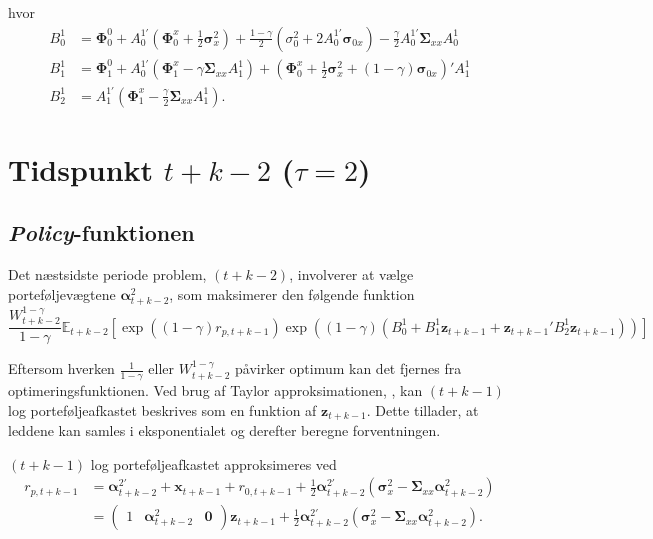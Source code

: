 \documentclass[
  a4paper,
  oneside]{memoir}
\begin{document}
hvor
\begin{align*}
B_0^1&=\bm{\Phi}_0^0 + A_0^{1\prime} \left(\bm{\Phi}_0^x + \frac{1}{2} \bm{\sigma}_x^2\right) + \frac{1-\gamma}{2}\left(\sigma_0^2 + 2 A_0^{1\prime} \bm{\sigma}_{0x}\right) - \frac{\gamma}{2} A_0^{1\prime} \bm{\Sigma}_{xx} A_0^1\\
B_1^1&=\bm{\Phi}_1^0 + A_0^{1\prime}\left(\bm{\Phi}_1^x - \gamma \bm{\Sigma}_{xx} A_1^1\right) + \left(\bm{\Phi}_{0}^x + \frac{1}{2} \bm{\sigma}_x^2 + \left(1-\gamma\right)\bm{\sigma}_{0x}\right)' A_1^1\\
B_2^1&=A_1^{1\prime} \left(\bm{\Phi}_1^x - \frac{\gamma}{2} \bm{\Sigma}_{xx} A_1^1\right).
\end{align*}

\hypertarget{tidspunkt-tk-2-tau2}{%
\section{\texorpdfstring{Tidspunkt \(t+k-2\) (\(\tau=2\))}{Tidspunkt t+k-2 (\textbackslash tau=2)}}\label{tidspunkt-tk-2-tau2}}

\hypertarget{policy-funktionen-1}{%
\subsection{\texorpdfstring{\emph{Policy}-funktionen}{Policy-funktionen}}\label{policy-funktionen-1}}

Det næstsidste periode problem, \((t+k-2)\), involverer at vælge porteføljevægtene \(\bm{\alpha}_{t+k-2}^2\), som maksimerer den følgende funktion
\[\frac{W_{t+k-2}^{1-\gamma}}{1-\gamma} \mathbb{E}_{t+k-2}\left[\exp\left(\left(1-\gamma\right) r_{p,t+k-1}\right) \exp\left(\left(1-\gamma\right) \left(B_0^1 + B_1^1 \bm{z}_{t+k-1} + \bm{z}_{t+k-1}' B_2^1\bm{z}_{t+k-1}\right)\right)\right]\]

Eftersom hverken \(\tfrac{1}{1-\gamma}\) eller \(W_{t+k-2}^{1-\gamma}\) påvirker optimum kan det fjernes fra optimeringsfunktionen. Ved brug af Taylor approksimationen, \citep{CampVicCha2003}, kan \((t+k-1)\) log porteføljeafkastet beskrives som en funktion af \(\bm{z}_{t+k-1}\). Dette tillader, at leddene kan samles i eksponentialet og derefter beregne forventningen.

\((t+k-1)\) log porteføljeafkastet approksimeres ved
\begin{align*}
r_{p,t+k-1}&=\bm{\alpha}_{t+k-2}^{2\prime} + \bm{x}_{t+k-1} + r_{0,t+k-1} + \frac{1}{2} \bm{\alpha}_{t+k-2}^{2\prime} \left(\bm{\sigma}_x^2 - \bm{\Sigma}_{xx} \bm{\alpha}_{t+k-2}^{2}\right)\\
           &=\begin{pmatrix} 1 & \bm{\alpha}_{t+k-2}^{2} & \bm{0}\end{pmatrix} \bm{z}_{t+k-1} + \frac{1}{2}\bm{\alpha}_{t+k-2}^{2\prime} \left(\bm{\sigma}_x^2 - \bm{\Sigma}_{xx} \bm{\alpha}_{t+k-2}^{2}\right).
\end{align*}
\end{document}
